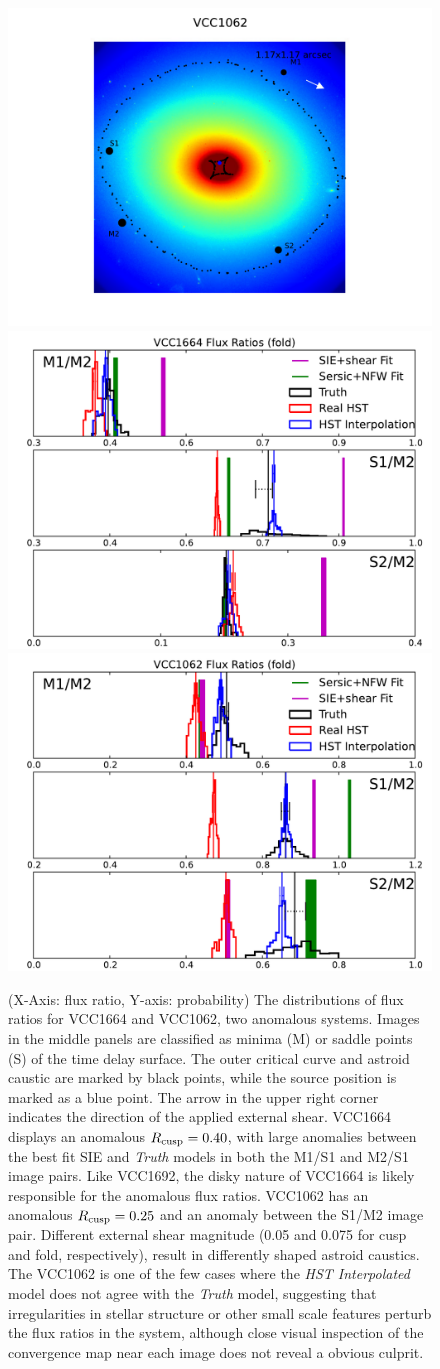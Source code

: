 \begin{figure}
	\includegraphics[trim=3cm 0cm 3cm 0cm,clip,width=.24\textwidth]{./figures_sls/kappamap_VCC1062_fold_withshear-eps-converted-to.pdf}
	\includegraphics[clip,trim=.85cm 0cm .1cm
	0cm,width=0.48\linewidth,keepaspectratio]{./figures_sls/VCC1664_fold_fluxratios-eps-converted-to.pdf}
	\includegraphics[clip,trim=.9cm 0cm .2cm
	0cm,width=0.48\linewidth,keepaspectratio]{./figures_sls/VCC1062_fold_fluxratios-eps-converted-to.pdf}
	\caption{\label{fig:fluxratios2} (X-Axis: flux ratio, Y-axis: probability) \newline The distributions of flux ratios for VCC1664 and VCC1062, two anomalous systems. Images in the middle panels are classified as minima (M) or saddle points (S) of the time delay surface. The outer critical curve and astroid caustic are marked by black points, while the source position is marked as a blue point. The arrow in the upper right corner indicates the direction of the applied external shear.  VCC1664 displays an anomalous $R_{\rm{cusp}} = 0.40$, with large anomalies between the best fit SIE and \textit{Truth} models in both the M1/S1 and M2/S1 image pairs. Like VCC1692, the disky nature of VCC1664 is likely responsible for the anomalous flux ratios.  VCC1062 has an anomalous $R_{\rm{cusp}} = 0.25$ and an anomaly between the S1/M2 image pair. Different external shear magnitude (0.05 and 0.075 for cusp and fold, respectively), result in differently shaped astroid caustics. The VCC1062 is one of the few cases where the \textit{HST Interpolated} model does not agree with the \textit{Truth} model, suggesting that irregularities in stellar structure or other small scale features perturb the flux ratios in the system, although close visual inspection of the convergence map near each image does not reveal a obvious culprit.} 
\end{figure}
